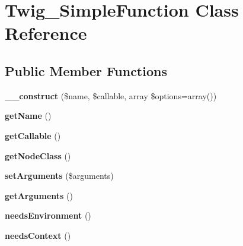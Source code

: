 \hypertarget{classTwig__SimpleFunction}{}\section{Twig\+\_\+\+Simple\+Function Class Reference}
\label{classTwig__SimpleFunction}
\subsection*{Public Member Functions}
\begin{DoxyCompactItemize}
\item 
{\bfseries \+\_\+\+\_\+construct} (\$name, \$callable, array \$options=array())\hypertarget{classTwig__SimpleFunction_a0a20f2dbaa644c67ff42216e8e88ab90}{}\label{classTwig__SimpleFunction_a0a20f2dbaa644c67ff42216e8e88ab90}

\item 
{\bfseries get\+Name} ()\hypertarget{classTwig__SimpleFunction_a5668161300994b8c6549b30f69f81557}{}\label{classTwig__SimpleFunction_a5668161300994b8c6549b30f69f81557}

\item 
{\bfseries get\+Callable} ()\hypertarget{classTwig__SimpleFunction_ab9ce517930ac17e7e5e088bfcef8c00e}{}\label{classTwig__SimpleFunction_ab9ce517930ac17e7e5e088bfcef8c00e}

\item 
{\bfseries get\+Node\+Class} ()\hypertarget{classTwig__SimpleFunction_a11a9919c1940b3ecf252b3e3035e1084}{}\label{classTwig__SimpleFunction_a11a9919c1940b3ecf252b3e3035e1084}

\item 
{\bfseries set\+Arguments} (\$arguments)\hypertarget{classTwig__SimpleFunction_a5fd9fa6879d692c68f49ff81efe7af06}{}\label{classTwig__SimpleFunction_a5fd9fa6879d692c68f49ff81efe7af06}

\item 
{\bfseries get\+Arguments} ()\hypertarget{classTwig__SimpleFunction_a35c29dc35126933a9990c765626f3dfe}{}\label{classTwig__SimpleFunction_a35c29dc35126933a9990c765626f3dfe}

\item 
{\bfseries needs\+Environment} ()\hypertarget{classTwig__SimpleFunction_a35f93faf9ef24f48bb499848e5956039}{}\label{classTwig__SimpleFunction_a35f93faf9ef24f48bb499848e5956039}

\item 
{\bfseries needs\+Context} ()\hypertarget{classTwig__SimpleFunction_a0278b7c0da22bfbf34341288b9ee5091}{}\label{classTwig__SimpleFunction_a0278b7c0da22bfbf34341288b9ee5091}


\end{DoxyCompactItemize}
